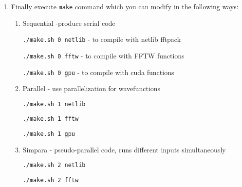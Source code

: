 \documentclass[12pt]{article}
\begin{document}
\begin{enumerate}
\hspace*{1cm}
{\tt .~/etc/profile.d/modules.sh} 

and for csh: 

\hspace*{1cm}
{\tt .~/etc/profile.d/modules.csh}. 

Once you have done this, you can run: 

\hspace*{1cm}
{\tt module load <module name>}


For example:

\hspace*{1cm}
{\tt module load intel/composer\_xe\_2013.4.183}

\hspace*{1cm}
{\tt module load cuda/5.0

\hspace*{1cm}
  module load openmpi/1.6.4-intel}

\newpage
\item Finally execute {\tt make} command which you can modify in the following ways:
\begin{enumerate}
\item Sequential -produce serial code

\hspace*{1cm}
{\tt ./make.sh 0 netlib} - to compile with netlib fftpack

\hspace*{1cm}
{\tt ./make.sh 0 fftw} - to compile with FFTW functions
 
\hspace*{1cm}
{\tt ./make.sh 0 gpu} - to compile with cuda functions

\item Parallel - use parallelization for wavefunctions

\hspace*{1cm}
{\tt ./make.sh 1 netlib} 

\hspace*{1cm}
{\tt ./make.sh 1 fftw} 
 
\hspace*{1cm}
{\tt ./make.sh 1 gpu} 

\item Simpara - pseudo-parallel code, runs different inputs simultaneously

\hspace*{1cm}
{\tt ./make.sh 2 netlib} 

\hspace*{1cm}
{\tt ./make.sh 2 fftw}
 

\end{enumerate}
\end{enumerate}
\end{document}
